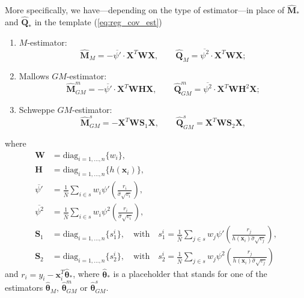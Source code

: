 \documentclass[a4paper,oneside,11pt,DIV=12]{scrartcl}
\theoremstyle{remark}
\begin{document}
More specifically, we have---depending on the type of estimator---in place of $\widehat{\bm M}_*$ and $\widehat{\bm Q}_*$ in the template (\ref{eq:reg_cov_est})
\begin{enumerate}
   \item{$M$-estimator:}
   \begin{equation*}
      \widehat{\bm M}_M = - \overline{\psi'} \cdot \bm X^T \bm W \bm X, \qquad \widehat{\bm Q}_M = \overline{\psi^2} \cdot \bm X^T \bm W \bm X;
   \end{equation*}
   \item{Mallows $GM$-estimator:}
   \begin{equation*}
      \widehat{\bm M}_{GM}^{m} = - \overline{\psi'} \cdot \bm X^T \bm W \bm H \bm X, \qquad \widehat{\bm Q}_{GM}^{m} = \overline{\psi^2} \cdot \bm X^T \bm W \bm H^2 \bm X;
   \end{equation*}
   \item{Schweppe $GM$-estimator:}
   \begin{equation*}
      \widehat{\bm M}_{GM}^{s} = - \bm X^T \bm W \bm S_1 \bm X, \qquad \widehat{\bm Q}_{GM}^{s} = \bm X^T \bm W \bm S_2 \bm X,
   \end{equation*}
\end{enumerate}
\noindent where
\begin{align*}
    \bm W &= \mathrm{diag}_{i=1,\ldots,n}\{w_i\}, \\
    \bm H &= \mathrm{diag}_{i=1,\ldots,n}\{h(\bm x_i)\}, \\
    \overline{\psi'} &= \frac{1}{\widehat{N}}\sum_{i \in s} w_i \psi' \left( \frac{r_i}{\widehat{\sigma} \sqrt{v_i}} \right), \\
    \overline{\psi^2} &= \frac{1}{\widehat{N}}\sum_{i \in s} w_i \psi^2 \left( \frac{r_i}{\widehat{\sigma} \sqrt{v_i}} \right), \\
    \bm S_1 &= \mathrm{diag}_{i=1,\ldots,n} \big\{ s_1^i \big\}, \quad \text{with} \quad s_1^i = \frac{1}{\widehat{N}}\sum_{j \in s} w_j \psi'\left(\frac{r_j}{h(\bm x_i)\widehat{\sigma} \sqrt{v_j}}\right), \\
    \bm S_2 &= \mathrm{diag}_{i=1,\ldots,n} \big\{ s_2^i \big\}, \quad \text{with} \quad s_2^i = \frac{1}{\widehat{N}}\sum_{j \in s} w_j \psi^2\left(\frac{r_j}{h(\bm x_i)\widehat{\sigma} \sqrt{v_j}}\right)
\end{align*}
\noindent and $r_i = y_i - \bm x_i^T \widehat{\bm \theta}_*$, where $\widehat{\bm \theta}_*$ is a placeholder that stands for one of the estimators $\widehat{\bm \theta}_M$, $\widehat{\bm \theta}_{GM}^m$ or $\widehat{\bm \theta}_{GM}^s$.
\end{document}
